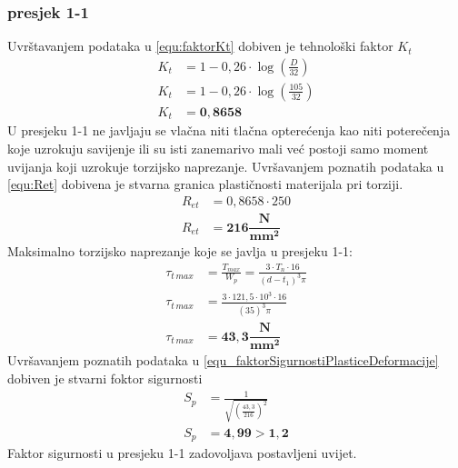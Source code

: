 \documentclass[11pt,a4paper]{report}
\begin{document}
\subsubsection{presjek 1-1}
Uvrštavanjem podataka u \eqref{equ:faktorKt} dobiven je tehnološki faktor $K_t$
\begin{align*}
K_t&=1-0,26\cdot \log \left( \frac{D}{32} \right)\\
K_t&=1-0,26\cdot \log \left( \frac{105}{32} \right)\\
K_t&=\mathbf{0,8658}
\end{align*}
U presjeku 1-1 ne javljaju se vlačna niti tlačna opterećenja kao niti poterečenja koje uzrokuju savijenje ili su isti zanemarivo mali već postoji samo moment uvijanja koji uzrokuje torzijsko naprezanje.
Uvršavanjem poznatih podataka u \eqref{equ:Ret} dobivena je stvarna granica plastičnosti materijala pri torziji.
\begin{align*}
R_{et}&=0,8658 \cdot 250\\
R_{et}&=\mathbf{216 \dfrac{N}{mm^2}}
\end{align*}
Maksimalno torzijsko naprezanje koje se javlja u presjeku 1-1:
\begin{align*}
\tau_{t \, max}&=\frac{T_{max}}{W_p}=\frac{3 \cdot T_n \cdot 16}{(d-t_1)^3 \pi}\\
\tau_{t \, max}&=\frac{3 \cdot 121,5\cdot 10^3 \cdot 16}{(35)^3 \pi}\\
\tau_{t \, max}&=\mathbf{43,3 \dfrac{N}{mm^2}}
\end{align*}
Uvršavanjem poznatih podataka u \eqref{equ_faktorSigurnostiPlasticeDeformacije} dobiven je stvarni foktor sigurnosti
\begin{align*}
S_p&=\frac{1}{\sqrt{\left(\frac{43,3}{216}\right)^2}}\\
S_p&=\mathbf{4,99 > 1,2}
\end{align*}
Faktor sigurnosti u presjeku 1-1 zadovoljava postavljeni uvijet.
\end{document}
